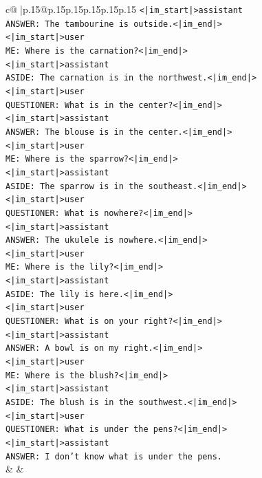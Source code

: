 \documentclass{article}
\begin{document}
{\begin{supertabular}{c@{$\;$}|p{.15\linewidth}@{}p{.15\linewidth}p{.15\linewidth}p{.15\linewidth}p{.15\linewidth}p{.15\linewidth}}
{{{\texttt{<|im\_start|>assistant} \\
\texttt{ANSWER: The tambourine is outside.<|im\_end|>} \\
\texttt{<|im\_start|>user} \\
\texttt{ME: Where is the carnation?<|im\_end|>} \\
\texttt{<|im\_start|>assistant} \\
\texttt{ASIDE: The carnation is in the northwest.<|im\_end|>} \\
\texttt{<|im\_start|>user} \\
\texttt{QUESTIONER: What is in the center?<|im\_end|>} \\
\texttt{<|im\_start|>assistant} \\
\texttt{ANSWER: The blouse is in the center.<|im\_end|>} \\
\texttt{<|im\_start|>user} \\
\texttt{ME: Where is the sparrow?<|im\_end|>} \\
\texttt{<|im\_start|>assistant} \\
\texttt{ASIDE: The sparrow is in the southeast.<|im\_end|>} \\
\texttt{<|im\_start|>user} \\
\texttt{QUESTIONER: What is nowhere?<|im\_end|>} \\
\texttt{<|im\_start|>assistant} \\
\texttt{ANSWER: The ukulele is nowhere.<|im\_end|>} \\
\texttt{<|im\_start|>user} \\
\texttt{ME: Where is the lily?<|im\_end|>} \\
\texttt{<|im\_start|>assistant} \\
\texttt{ASIDE: The lily is here.<|im\_end|>} \\
\texttt{<|im\_start|>user} \\
\texttt{QUESTIONER: What is on your right?<|im\_end|>} \\
\texttt{<|im\_start|>assistant} \\
\texttt{ANSWER: A bowl is on my right.<|im\_end|>} \\
\texttt{<|im\_start|>user} \\
\texttt{ME: Where is the blush?<|im\_end|>} \\
\texttt{<|im\_start|>assistant} \\
\texttt{ASIDE: The blush is in the southwest.<|im\_end|>} \\
\texttt{<|im\_start|>user} \\
\texttt{QUESTIONER: What is under the pens?<|im\_end|>} \\
\texttt{<|im\_start|>assistant} \\
\texttt{ANSWER: I don't know what is under the pens.} \\
            }
        }
    }
    & & \\ \\


\end{supertabular}}
\end{document}

